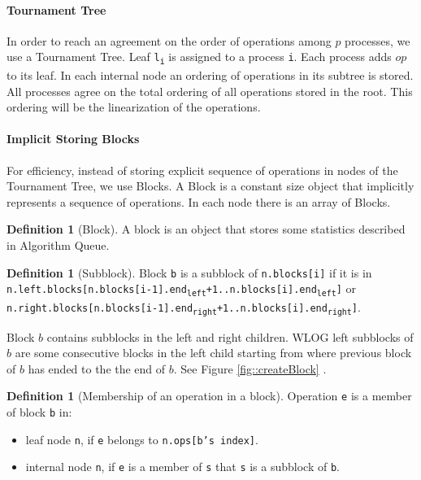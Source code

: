 \documentclass[10pt]{article}
\theoremstyle{definition}
\newtheorem{definition}[theorem]{Definition}
\begin{document}
\paragraph{Tournament Tree}
In order to reach an agreement on the order of operations among $p$ processes, we use a Tournament Tree. Leaf \texttt{l\textsubscript{i}} is assigned to a process \texttt{i}. Each process adds $op$ to its leaf. In each internal node an ordering of operations in its subtree is stored. All processes agree on the total ordering of all operations stored in the root. This ordering will be the linearization of the operations.
\paragraph{Implicit Storing Blocks}
For efficiency, instead of storing explicit sequence of operations in nodes of the Tournament Tree, we use Blocks. A Block is a constant size object that implicitly represents a sequence of operations. In each node there is an array of Blocks.

\begin{definition}[Block]
A block is an object that stores some statistics described in Algorithm Queue.   
\end{definition}

\begin{definition}[\label{def::subblock}Subblock]
Block \texttt{b} is a subblock of \texttt{n.blocks[i]} if it is in \texttt{n.left.blocks[n.blocks[i-1].end\textsubscript{left}+1..n.blocks[i].end\textsubscript{left}]} or \texttt{n.right.blocks[n.blocks[i-1].end\textsubscript{right}+1..n.blocks[i].end\textsubscript{right}]}.
\end{definition}
Block $b$ contains subblocks in the left and right children. WLOG left subblocks of $b$ are some consecutive blocks in the left child starting from where previous block of $b$ has ended to the the end of $b$. See Figure \ref{fig::createBlock} .


\begin{definition}[Membership of an operation in a block]
Operation \texttt{e} is a member of block \texttt{b} in:
\begin{itemize}
 \item leaf node \texttt{n}, if \texttt{e} belongs to \texttt{n.ops[b's index]}.
 \item internal node \texttt{n}, if \texttt{e} is a member of \texttt{s} that \texttt{s} is a subblock of \texttt{b}.
\end{itemize}
  
\end{definition}
\end{document}
